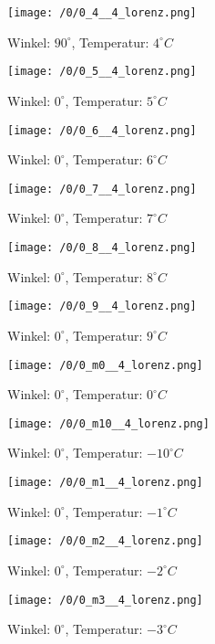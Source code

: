 \begin{figure}[c]
\centering
\texttt{[image: /0/0\_4\_\_4\_lorenz.png]}
\caption{Winkel: $ 90^\circ$, Temperatur: $ 4^\circ C$}
\end{figure}
\clearpage
\begin{figure}[c]
\centering
\texttt{[image: /0/0\_5\_\_4\_lorenz.png]}
\caption{Winkel: $ 0^\circ$, Temperatur: $ 5^\circ C$}
\end{figure}
\begin{figure}[c]
\centering
\texttt{[image: /0/0\_6\_\_4\_lorenz.png]}
\caption{Winkel: $ 0^\circ$, Temperatur: $ 6^\circ C$}
\end{figure}
\clearpage
\begin{figure}[c]
\centering
\texttt{[image: /0/0\_7\_\_4\_lorenz.png]}
\caption{Winkel: $ 0^\circ$, Temperatur: $ 7^\circ C$}
\end{figure}
\begin{figure}[c]
\centering
\texttt{[image: /0/0\_8\_\_4\_lorenz.png]}
\caption{Winkel: $ 0^\circ$, Temperatur: $ 8^\circ C$}
\end{figure}
\clearpage
\begin{figure}[c]
\centering
\texttt{[image: /0/0\_9\_\_4\_lorenz.png]}
\caption{Winkel: $ 0^\circ$, Temperatur: $ 9^\circ C$}
\end{figure}
\begin{figure}[c]
\centering
\texttt{[image: /0/0\_m0\_\_4\_lorenz.png]}
\caption{Winkel: $ 0^\circ$, Temperatur: $ 0^\circ C$}
\end{figure}
\clearpage
\begin{figure}[c]
\centering
\texttt{[image: /0/0\_m10\_\_4\_lorenz.png]}
\caption{Winkel: $ 0^\circ$, Temperatur: $ -10^\circ C$}
\end{figure}
\begin{figure}[c]
\centering
\texttt{[image: /0/0\_m1\_\_4\_lorenz.png]}
\caption{Winkel: $ 0^\circ$, Temperatur: $ -1^\circ C$}
\end{figure}
\clearpage
\begin{figure}[c]
\centering
\texttt{[image: /0/0\_m2\_\_4\_lorenz.png]}
\caption{Winkel: $ 0^\circ$, Temperatur: $ -2^\circ C$}
\end{figure}
\begin{figure}[c]
\centering
\texttt{[image: /0/0\_m3\_\_4\_lorenz.png]}
\caption{Winkel: $ 0^\circ$, Temperatur: $ -3^\circ C$}
\end{figure}
